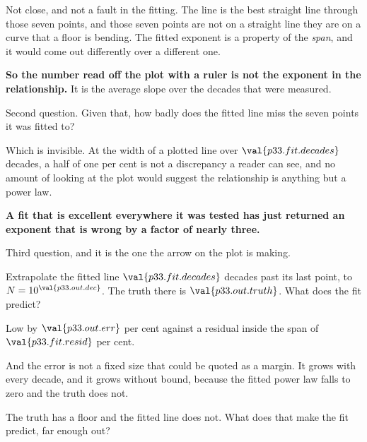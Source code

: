 \begin{fr}
Not close, and not a fault in the fitting. The line is the best straight line
through those seven points, and those seven points are not on a straight
line \dash{} they are on a curve that a floor is bending. The fitted exponent
is a property of the \emph{span}, and it would come out differently over a
different one.

\textbf{So the number read off the plot with a ruler is not the exponent in
the relationship.} It is the average slope over the decades that were
measured.
\end{fr}

\begin{fr}
Second question. Given that, how badly does the fitted line miss the seven
points it was fitted to?
\dotline
\nextframe
\end{fr}

\begin{fr}
Which is invisible. At the width of a plotted line over
$\val{p33.fit.decades}$ decades, a half of one per cent is not a discrepancy
a reader can see, and no amount of looking at the plot would suggest the
relationship is anything but a power law.

\textbf{A fit that is excellent everywhere it was tested has just returned an
exponent that is wrong by a factor of nearly three.}
\end{fr}

\begin{fr}
Third question, and it is the one the arrow on the plot is making.

Extrapolate the fitted line $\val{p33.fit.decades}$ decades past its last
point, to $N = 10^{\val{p33.out.dec}}$. The truth there is
$\val{p33.out.truth}$. What does the fit predict?
\dotline
\nextframe
\end{fr}

\begin{fr}
Low by $\val{p33.out.err}$ per cent \dash{} against a residual inside the
span of $\val{p33.fit.resid}$ per cent.

And the error is not a fixed size that could be quoted as a margin. It grows
with every decade, and it grows without bound, because the fitted power law
falls to zero and the truth does not.

The truth has a floor and the fitted line does not. What does that make the
fit predict, far enough out?
\dotline
\nextframe
\end{fr}

